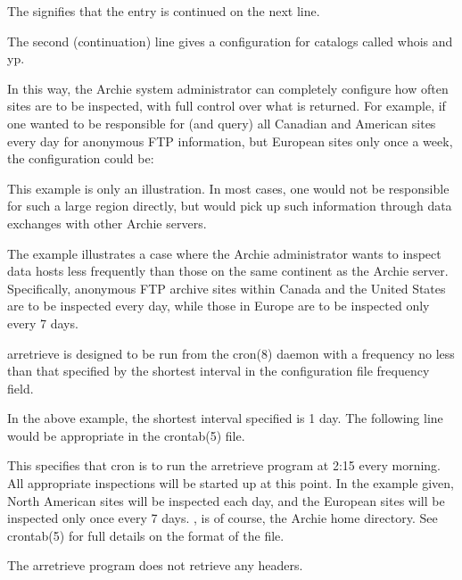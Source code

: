 The  signifies that the entry is continued on the next line.

The second (continuation) line gives a configuration for catalogs called whois and yp.

In this way, the Archie system administrator can completely configure how often sites are to be inspected, with full control over what is returned. For example, if one wanted to be responsible for (and query) all Canadian and American sites every day for anonymous FTP information, but European sites only once a week, the configuration could be:




This example is only an illustration. In most cases, one would not be responsible for such a large region directly, but would pick up such information through data exchanges with other Archie servers.

The example illustrates a case where the Archie administrator wants to inspect data hosts less frequently than those on the same continent as the Archie server. Specifically, anonymous FTP archive sites within Canada and the United States are to be inspected every day, while those in Europe are to be inspected only every 7 days. 

arretrieve is designed to be run from the cron(8) daemon with a frequency no less than that specified by the shortest interval in the configuration file frequency field.

In the above example, the shortest interval specified is 1 day. The following line would be appropriate in the crontab(5) file.


This specifies that cron is to run the arretrieve program at 2:15 every
morning. All appropriate inspections will be started up at this point. In the
example given, North American sites will be inspected each day, and the
European sites will be inspected only once every 7 days. \Archie, is of
course, the Archie home directory. See crontab(5) for full details on the
format of the file.


The arretrieve program does not retrieve any headers.

\NOTE


